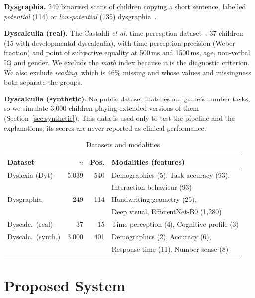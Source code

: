 \documentclass[conference]{IEEEtran}
\begin{document}
\textbf{Dysgraphia.} 249 binarised scans of children copying a short sentence, labelled \emph{potential}
(114) or \emph{low-potential} (135) dysgraphia~\cite{dysgraphiadata}. %

\textbf{Dyscalculia (real).} The Castaldi \emph{et al.} time-perception dataset~\cite{castaldi2024data}: 37 children
(15 with developmental dyscalculia), with time-perception precision (Weber fraction) and point of subjective equality
at 500\,ms and 1500\,ms, age, non-verbal IQ and gender. We exclude the \emph{math} index because it is the
diagnostic criterion. We also exclude \emph{reading}, which is 46\% missing and whose values and missingness both
separate the groups.

\textbf{Dyscalculia (synthetic).} No public dataset matches our game's number tasks, so we simulate 3,000 children
playing extended versions of them (Section~\ref{sec:synthetic}). This data is used only to test the pipeline and the
explanations; its scores are never reported as clinical performance.

\begin{table}[t]
\caption{Datasets and modalities}
\label{tab:data}
\centering
\footnotesize
\setlength{\tabcolsep}{3pt}
\begin{tabular}{@{}lrrl@{}}
\toprule
Dataset & $n$ & Pos. & Modalities (features) \\
\midrule
Dyslexia (Dyt) & 5,039 & 540 & Demographics (5), Task accuracy (93), \\
 & & & Interaction behaviour (93) \\
Dysgraphia & 249 & 114 & Handwriting geometry (25), \\
 & & & Deep visual, EfficientNet-B0 (1,280) \\
Dyscalc.\ (real) & 37 & 15 & Time perception (4), Cognitive profile (3) \\
Dyscalc.\ (synth.) & 3,000 & 401 & Demographics (2), Accuracy (6), \\
 & & & Response time (11), Number sense (8) \\
\bottomrule
\end{tabular}
\end{table}

\section{Proposed System}
\end{document}
